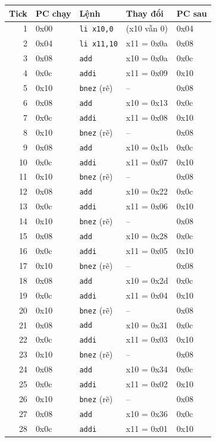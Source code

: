 \documentclass[11pt,a4paper]{article}
\begin{document}
\small
\begin{longtable}{@{}rllll@{}}
\toprule
\textbf{Tick} & \textbf{PC chạy} & \textbf{Lệnh} & \textbf{Thay đổi} & \textbf{PC sau}\\
\midrule
\endhead
1 & 0x00 & \texttt{li x10,0} & (x10 vẫn 0) & 0x04\\
2 & 0x04 & \texttt{li x11,10} & x11 = 0x0a & 0x08\\
3 & 0x08 & \texttt{add} & x10 = 0x0a & 0x0c\\
4 & 0x0c & \texttt{addi} & x11 = 0x09 & 0x10\\
5 & 0x10 & \texttt{bnez} (rẽ) & -- & 0x08\\
6 & 0x08 & \texttt{add} & x10 = 0x13 & 0x0c\\
7 & 0x0c & \texttt{addi} & x11 = 0x08 & 0x10\\
8 & 0x10 & \texttt{bnez} (rẽ) & -- & 0x08\\
9 & 0x08 & \texttt{add} & x10 = 0x1b & 0x0c\\
10 & 0x0c & \texttt{addi} & x11 = 0x07 & 0x10\\
11 & 0x10 & \texttt{bnez} (rẽ) & -- & 0x08\\
12 & 0x08 & \texttt{add} & x10 = 0x22 & 0x0c\\
13 & 0x0c & \texttt{addi} & x11 = 0x06 & 0x10\\
14 & 0x10 & \texttt{bnez} (rẽ) & -- & 0x08\\
15 & 0x08 & \texttt{add} & x10 = 0x28 & 0x0c\\
16 & 0x0c & \texttt{addi} & x11 = 0x05 & 0x10\\
17 & 0x10 & \texttt{bnez} (rẽ) & -- & 0x08\\
18 & 0x08 & \texttt{add} & x10 = 0x2d & 0x0c\\
19 & 0x0c & \texttt{addi} & x11 = 0x04 & 0x10\\
20 & 0x10 & \texttt{bnez} (rẽ) & -- & 0x08\\
21 & 0x08 & \texttt{add} & x10 = 0x31 & 0x0c\\
22 & 0x0c & \texttt{addi} & x11 = 0x03 & 0x10\\
23 & 0x10 & \texttt{bnez} (rẽ) & -- & 0x08\\
24 & 0x08 & \texttt{add} & x10 = 0x34 & 0x0c\\
25 & 0x0c & \texttt{addi} & x11 = 0x02 & 0x10\\
26 & 0x10 & \texttt{bnez} (rẽ) & -- & 0x08\\
27 & 0x08 & \texttt{add} & x10 = 0x36 & 0x0c\\
28 & 0x0c & \texttt{addi} & x11 = 0x01 & 0x10\\

\end{longtable}
\end{document}
